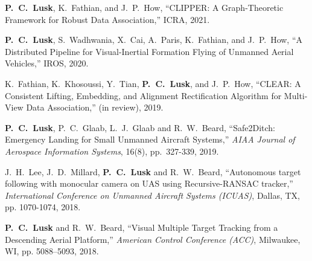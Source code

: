 

\renewcommand{\section}[2]{} %
\begin{thebibliography}{aa}

 \textbf{P.\ C.\ Lusk}, K.\ Fathian, and J.\ P.\ How, ``CLIPPER: A Graph-Theoretic Framework for Robust Data Association,'' ICRA, 2021.

 \textbf{P.\ C.\ Lusk}, S.\ Wadhwania, X.\ Cai, A.\ Paris, K.\ Fathian, and J.\ P.\ How, ``A Distributed Pipeline for Visual-Inertial Formation Flying of Unmanned Aerial Vehicles,'' IROS, 2020.

 K.\ Fathian, K.\ Khosoussi, Y.\ Tian, \textbf{P.\ C.\ Lusk}, and J.\ P.\ How, ``CLEAR: A Consistent Lifting, Embedding, and Alignment Rectification Algorithm for Multi-View Data Association,'' (in review), 2019.

 \textbf{P.\ C.\ Lusk}, P.\ C.\ Glaab, L.\ J.\ Glaab and R.\ W.\ Beard, ``Safe2Ditch: Emergency Landing for Small Unmanned Aircraft Systems,'' \emph{AIAA Journal of Aerospace Information Systems}, 16(8), pp.\ 327-339, 2019.

 J.\ H.\ Lee, J.\ D.\ Millard, \textbf{P.\ C.\ Lusk} and R.\ W.\ Beard, ``Autonomous target following with monocular camera on UAS using Recursive-RANSAC tracker,'' \emph{International Conference on Unmanned Aircraft Systems (ICUAS)}, Dallas, TX, pp. 1070-1074, 2018.

 \textbf{P.\ C.\ Lusk} and R.\ W.\ Beard, ``Visual Multiple Target Tracking from a Descending Aerial Platform,'' \emph{American Control Conference (ACC)}, Milwaukee, WI, pp. 5088–5093, 2018.

\end{thebibliography}